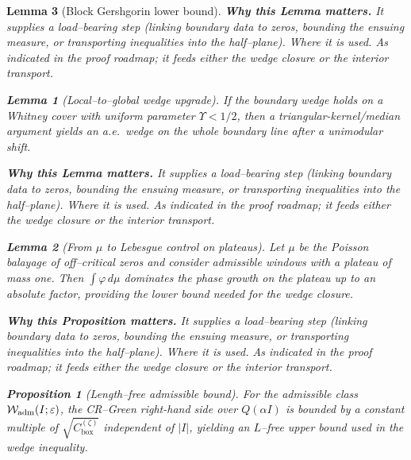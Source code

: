 \documentclass[11pt]{article}
\newtheorem{proposition}{Proposition}[section]
\newtheorem{lemma}{Lemma}[section]
\theoremstyle{definition}
\theoremstyle{remark}
\providecommand{\Cbox}{C^{(\zeta)}_{\mathrm{box}}}
\begin{document}
\begin{lemma}[Block Gershgorin lower bound]
\noindent\textbf{Why this Lemma matters.} It supplies a load--bearing step (linking boundary data to zeros, bounding the ensuing measure, or transporting inequalities into the half--plane).
\noindent\textit{Where it is used.} As indicated in the proof roadmap; it feeds either the wedge closure or the interior transport.
\begin{lemma}[Local--to--global wedge upgrade]\label{lem:local-to-global-wedge}
If the boundary wedge holds on a Whitney cover with uniform parameter $\Upsilon<1/2$, then a triangular-kernel/median argument yields an a.e.\ wedge on the whole boundary line after a unimodular shift.
\end{lemma}

\noindent\textbf{Why this Lemma matters.} It supplies a load--bearing step (linking boundary data to zeros, bounding the ensuing measure, or transporting inequalities into the half--plane).
\noindent\textit{Where it is used.} As indicated in the proof roadmap; it feeds either the wedge closure or the interior transport.
\begin{lemma}[From $\mu$ to Lebesgue control on plateaus]\label{lem:mu-to-lebesgue}
Let $\mu$ be the Poisson balayage of off--critical zeros and consider admissible windows with a plateau of mass one. Then $\int \varphi\,d\mu$ dominates the phase growth on the plateau up to an absolute factor, providing the lower bound needed for the wedge closure.
\end{lemma}

\noindent\textbf{Why this Proposition matters.} It supplies a load--bearing step (linking boundary data to zeros, bounding the ensuing measure, or transporting inequalities into the half--plane).
\noindent\textit{Where it is used.} As indicated in the proof roadmap; it feeds either the wedge closure or the interior transport.
\begin{proposition}[Length--free admissible bound]\label{prop:length-free}
For the admissible class $\mathcal W_{\rm adm}(I;\varepsilon)$, the CR--Green right-hand side over $Q(\alpha I)$ is bounded by a constant multiple of $\sqrt{\Cbox}$ independent of $|I|$, yielding an $L$--free upper bound used in the wedge inequality.
\end{proposition}
\appendix


\end{lemma}
\end{document}
